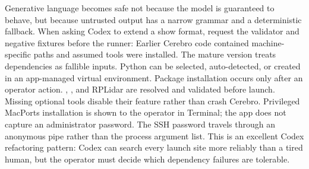 {}Generative language becomes safe not because the model is guaranteed to behave,\markdownRendererSoftLineBreak
{}but because untrusted output has a narrow grammar and a deterministic fallback.\markdownRendererParagraphSeparator
{}When asking Codex to extend a show format, request the validator and negative\markdownRendererSoftLineBreak
{}fixtures before the runner:\markdownRendererInterblockSeparator
{}\markdownRendererInterblockSeparator
{}\markdownRendererThematicBreak{}\markdownRendererInterblockSeparator
{}
\markdownRendererSectionEnd \markdownRendererSectionBegin
{}\markdownRendererInterblockSeparator
{}Earlier Cerebro code contained machine-specific paths and assumed tools were\markdownRendererSoftLineBreak
{}installed. The mature version treats dependencies as fallible inputs.\markdownRendererParagraphSeparator
{}Python can be selected, auto-detected, or created in an app-managed virtual\markdownRendererSoftLineBreak
{}environment. Package installation occurs only after an operator action.\markdownRendererSoftLineBreak
{}, , and RPLidar are resolved and validated before launch.\markdownRendererSoftLineBreak
{}Missing optional tools disable their feature rather than crash Cerebro.\markdownRendererSoftLineBreak
{}Privileged MacPorts installation is shown to the operator in Terminal; the app\markdownRendererSoftLineBreak
{}does not capture an administrator password. The SSH password travels through an\markdownRendererSoftLineBreak
{}anonymous pipe rather than the process argument list.\markdownRendererParagraphSeparator
{}This is an excellent Codex refactoring pattern:\markdownRendererInterblockSeparator
{}\markdownRendererInterblockSeparator
{}Codex can search every launch site more reliably than a tired human, but the\markdownRendererSoftLineBreak
{}operator must decide which dependency failures are tolerable.\markdownRendererInterblockSeparator
{}\markdownRendererThematicBreak{}\markdownRendererInterblockSeparator
{}
\markdownRendererSectionEnd \markdownRendererSectionBegin
{}\markdownRendererInterblockSeparator
